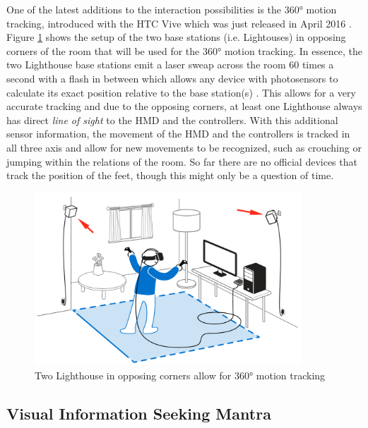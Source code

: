 One of the latest additions to the interaction possibilities is the 360° motion tracking, introduced with the HTC Vive which was just released in April 2016 \citep{Htcvive2016}. Figure \ref{fig:lighthouses} shows the setup of the two base stations (i.e. Lightouses) in opposing corners of the room that will be used for the 360° motion tracking. In essence, the two Lighthouse base stations emit a laser sweap across the room 60 times a second with a flash in between which allows any device with photosensors to calculate its exact position relative to the base station(s) \citep{Gizmodo2015}. This allows for a very accurate tracking and due to the opposing corners, at least one Lighthouse always has direct \textit{line of sight} to the HMD and the controllers. \newline
With this additional sensor information, the movement of the HMD and the controllers is tracked in all three axis and allow for new movements to be recognized, such as crouching or jumping within the relations of the room. \newline
So far there are no official devices that track the position of the feet, though this might only be a question of time.
\begin{figure}[h]
	\begin{center}
		\includegraphics[width=10cm]{03_Figures/05_LitReview/HTCCorp2016_LighthouseRoomScale.png}
		\caption[Two Lighthouse in opposing corners allow for 360° motion tracking]{Two Lighthouse in opposing corners allow for 360° motion tracking \citep{HTCCorp2016}}
		\label{fig:lighthouses}
	\end{center}
\end{figure}


\subsection{Visual Information Seeking Mantra}

